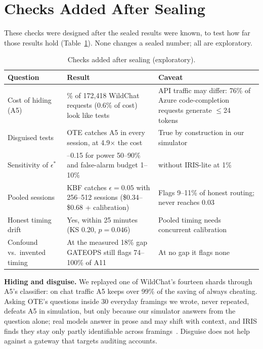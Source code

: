 \section{Checks Added After Sealing}\label{sec:posthoc}

These checks were designed after the sealed results were known, to test how far those results hold
(Table~\ref{tab:posthoc}). None changes a sealed number; all are exploratory.

\begin{table}[t]
\centering
\caption{Checks added after sealing (exploratory).}
\label{tab:posthoc}
\footnotesize
\setlength{\tabcolsep}{3pt}
\begin{tabular}{@{}>{\raggedright\arraybackslash}p{}>{\raggedright\arraybackslash}p{}>{\raggedright\arraybackslash}p{}@{}}
\toprule
Question & Result & Caveat \\
\midrule
Cost of hiding (A5) & 3.3\% of 172,418 WildChat requests (0.6\% of cost) look like tests & API traffic may differ: 76\% of Azure code-completion requests generate $\le$24 tokens~\cite{splitwise2024} \\
Disguised tests & OTE catches A5 in every session, at 4.9$\times$ the cost & True by construction in our simulator \\
Sensitivity of $\epsilon^*$ & 0.07--0.15 for power 50--90\% and false-alarm budget 1--10\% & 0.25 without IRIS-lite at 1\% \\
Pooled sessions & KBF catches $\epsilon = 0.05$ with 256--512 sessions (\$0.34--\$0.68 + calibration) & Flags 9--11\% of honest routing; never reaches 0.03 \\
Honest timing drift & Yes, within 25 minutes (KS 0.20, $p = 0.046$) & Pooled timing needs concurrent calibration \\
Confound vs.\ invented timing & At the measured 18\% gap GATEOPS still flags 74--100\% of A11 & At no gap it flags none \\
\bottomrule
\end{tabular}
\end{table}

\textbf{Hiding and disguise.} We replayed one of WildChat's fourteen shards through A5's classifier:
on chat traffic A5 keeps over 99\% of the saving of always cheating. Asking OTE's questions inside 30
everyday framings we wrote, never repeated, defeats A5 in simulation, but only because our simulator
answers from the question alone; real models answer in prose and may shift with context, and IRIS
finds they stay only partly identifiable across framings~\cite{iris2026}. Disguise does not help
against a gateway that targets auditing accounts.

